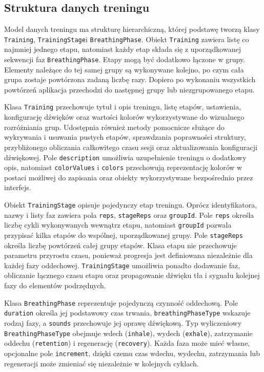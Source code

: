 \subsection{Struktura danych treningu}

Model danych treningu ma strukturę hierarchiczną, której podstawę tworzą klasy \texttt{Training}, \texttt{TrainingStage}i \texttt{BreathingPhase}. Obiekt \texttt{Training} zawiera listę co najmniej jednego etapu, natomiast każdy etap składa się z uporządkowanej sekwencji faz \texttt{BreathingPhase}. Etapy mogą być dodatkowo łączone w grupy. Elementy należące do tej samej grupy są wykonywane kolejno, po czym cała grupa zostaje powtórzona zadaną liczbę razy. Dopiero po wykonaniu wszystkich powtórzeń aplikacja przechodzi do następnej grupy lub niezgrupowanego etapu.

Klasa \texttt{Training} przechowuje tytuł i opis treningu, listę etapów, ustawienia, konfigurację dźwięków oraz wartości kolorów wykorzystywane do wizualnego rozróżniania grup. Udostępnia również metody pomocnicze służące do wykrywania i usuwania pustych etapów, sprawdzania poprawności struktury, przybliżonego obliczania całkowitego czasu sesji oraz aktualizowania konfiguracji dźwiękowej. Pole \texttt{description} umożliwia uzupełnienie treningu o dodatkowy opis, natomiast \texttt{colorValues} i \texttt{colors} przechowują reprezentację kolorów w postaci możliwej do zapisania oraz obiekty wykorzystywane bezpośrednio przez interfejs.

Obiekt \texttt{TrainingStage} opisuje pojedynczy etap treningu. Oprócz identyfikatora, nazwy i listy faz zawiera pola \texttt{reps}, \texttt{stageReps} oraz \texttt{groupId}. Pole \texttt{reps} określa liczbę cykli wykonywanych wewnątrz etapu, natomiast \texttt{groupId} pozwala przypisać kilka etapów do wspólnej, uporządkowanej grupy. Pole \texttt{stageReps} określa liczbę powtórzeń całej grupy etapów. Klasa etapu nie przechowuje parametru przyrostu czasu, ponieważ progresja jest definiowana niezależnie dla każdej fazy oddechowej. \texttt{TrainingStage} umożliwia ponadto dodawanie faz, obliczanie łącznego czasu etapu oraz propagowanie dźwięku tła i sygnału kolejnej fazy do elementów podrzędnych.

Klasa \texttt{BreathingPhase} reprezentuje pojedynczą czynność oddechową. Pole \texttt{duration} określa jej podstawowy czas trwania, \texttt{breathingPhaseType} wskazuje rodzaj fazy, a \texttt{sounds} przechowuje jej oprawę dźwiękową. Typ wyliczeniowy \texttt{BreathingPhaseType} obejmuje wdech (\texttt{inhale}), wydech (\texttt{exhale}), zatrzymanie oddechu (\texttt{retention}) i regenerację (\texttt{recovery}). Każda faza może mieć własne, opcjonalne pole \texttt{increment}, dzięki czemu czas wdechu, wydechu, zatrzymania lub regeneracji może zmieniać się niezależnie w kolejnych cyklach.

